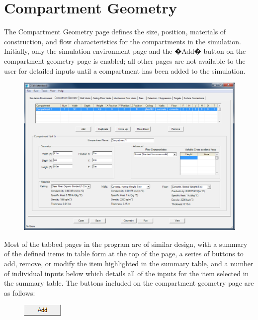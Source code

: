 \section{Compartment Geometry}

The Compartment Geometry page defines the size, position, materials of construction, and flow characteristics for the compartments in the simulation. Initially, only the simulation environment page and the �Add� button on the compartment geometry page is enabled; all other pages are not available to the user for detailed inputs until a compartment has been added to the simulation.

\begin{figure}[h!]
\begin{center}
\includegraphics[width=6.5in]{FIGURES/Input_File/Compartment_Geometry_Tab}
\end{center}
\end{figure}

Most of the tabbed pages in the program are of similar design, with a summary of the defined items in table form at the top of the page, a series of buttons to add, remove, or modify the item highlighted in the summary table, and a number of individual inputs below which details all of the inputs for the item selected in the summary table. The buttons included on the compartment geometry page are as follows: \\

\begin{figure}
  \includegraphics[width=0.781in]{FIGURES/Input_File/Add_Button}
\end{figure}

